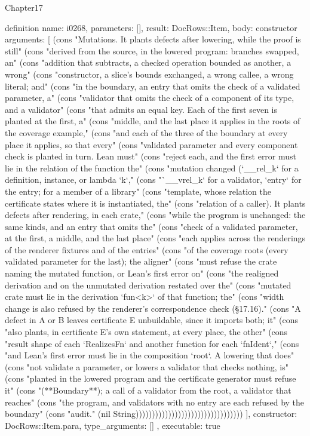 \begin{lexlean}{Chapter17}
\begin{semanticmodule}
definition{
  name: i0268,
  parameters: [],
  result: DocRows::Item,
  body: constructor{
    arguments: [
      (cons "Mutations. It plants defects after lowering, while the proof is still" (cons "derived from the source, in the lowered program: branches swapped, an" (cons "addition that subtracts, a checked operation bounded as another, a wrong" (cons "constructor, a slice's bounds exchanged, a wrong callee, a wrong literal; and" (cons "in the boundary, an entry that omits the check of a validated parameter, a" (cons "validator that omits the check of a component of its type, and a validator" (cons "that admits an equal key. Each of the first seven is planted at the first, a" (cons "middle, and the last place it applies in the roots of the coverage example," (cons "and each of the three of the boundary at every place it applies, so that every" (cons "validated parameter and every component check is planted in turn. Lean must" (cons "reject each, and the first error must lie in the relation of the function the" (cons "mutation changed (`__rel_k` for a definition, instance, or lambda `k`," (cons "`__vrel_k` for a validator, `entry` for the entry; for a member of a library" (cons "template, whose relation the certificate states where it is instantiated, the" (cons "relation of a caller). It plants defects after rendering, in each crate," (cons "while the program is unchanged: the same kinds, and an entry that omits the" (cons "check of a validated parameter, at the first, a middle, and the last place" (cons "each applies across the renderings of the renderer fixtures and of the entries" (cons "of the coverage roots (every validated parameter for the last); the aligner" (cons "must refuse the crate naming the mutated function, or Lean's first error on" (cons "the realigned derivation and on the unmutated derivation restated over the" (cons "mutated crate must lie in the derivation `fun<k>` of that function; the" (cons "width change is also refused by the renderer's correspondence check (§17.16)." (cons "A defect in A or B leaves certificate E unbuildable, since it imports both; it" (cons "also plants, in certificate E's own statement, at every place, the other" (cons "result shape of each `RealizesFn` and another function for each `fnIdent`," (cons "and Lean's first error must lie in the composition `root`. A lowering that does" (cons "not validate a parameter, or lowers a validator that checks nothing, is" (cons "planted in the lowered program and the certificate generator must refuse it" (cons "(**Boundary**); a call of a validator from the root, a validator that reaches" (cons "the program, and validators with no entry are each refused by the boundary" (cons "audit." (nil String)))))))))))))))))))))))))))))))))
    ],
    constructor: DocRows::Item.para,
    type_arguments: []
  },
  executable: true
}


\end{semanticmodule}
\end{lexlean}

